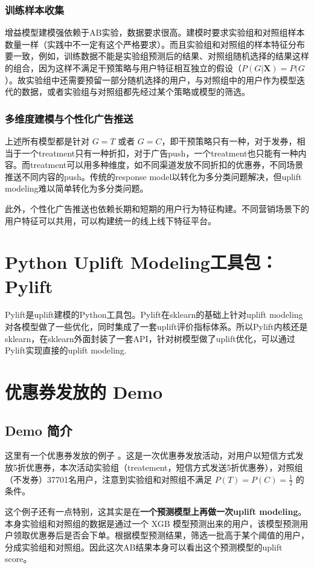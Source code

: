 \documentclass[12pt]{article}
\begin{document}
\subsubsection{训练样本收集}
增益模型建模强依赖于AB实验，数据要求很高。建模时要求实验组和对照组样本数量一样（实践中不一定有这个严格要求）。而且实验组和对照组的样本特征分布要一致，例如，训练数据不能是实验组预测后的结果、对照组随机选择的结果这样的组合，因为这样不满足干预策略与用户特征相互独立的假设（$P(G | \boldsymbol{X}) = P(G$）。故实验组中还需要预留一部分随机选择的用户，与对照组中的用户作为模型迭代的数据，或者实验组与对照组都先经过某个策略或模型的筛选。

\subsubsection{多维度建模与个性化广告推送}
上述所有模型都是针对 $G=T$ 或者 $G=C$，即干预策略只有一种，对于发券，相当于一个treatment只有一种折扣，对于广告push，一个treatment也只能有一种内容。而treatment可以用多种维度，如不同渠道发放不同折扣的优惠券，不同场景推送不同内容的push。传统的response model以转化为多分类问题解决，但uplift modeling难以简单转化为多分类问题。

此外，个性化广告推送也依赖长期和短期的用户行为特征构建。不同营销场景下的用户特征可以共用，可以构建统一的线上线下特征平台。


\section{Python Uplift Modeling工具包：Pylift}
Pylift是uplift建模的Python工具包。Pylift在sklearn的基础上针对uplift modeling对各模型做了一些优化，同时集成了一套uplift评价指标体系。所以Pylift内核还是sklearn，在sklearn外面封装了一套API，针对树模型做了uplift优化，可以通过Pylift实现直接的uplift modeling.


\section{优惠券发放的 Demo}
\subsection{Demo 简介}
这里有一个优惠券发放的例子 。这是一次优惠券发放活动，对用户以短信方式发放5折优惠券，本次活动实验组（treatement，短信方式发送5折优惠券），对照组（不发券）37701名用户，注意到实验组和对照组不满足 $P(T) = P(C) = \frac{1}{2}$ 的条件。

这个例子还有一点特别，这其实是在\textbf{一个预测模型上再做一次uplift modeling}。本身实验组和对照组的数据是通过一个 XGB 模型预测出来的用户，该模型预测用户领取优惠券后是否会下单。根据模型预测结果，筛选一批高于某个阈值的用户，分成实验组和对照组。因此这次AB结果本身可以看出这个预测模型的uplift score。
\end{document}
